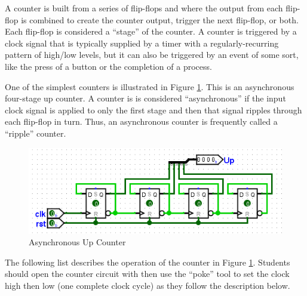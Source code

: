 A counter is built from a series of flip-flops and where the output from each flip-flop is combined to create the counter output, trigger the next flip-flop, or both. Each flip-flop is considered a ``stage'' of the counter. A counter is triggered by a clock signal that is typically supplied by a timer with a regularly-recurring pattern of high/low levels, but it can also be triggered by an event of some sort, like the press of a button or the completion of a process.

One of the simplest counters is illustrated in Figure \ref{fig:count-01}. This is an asynchronous four-stage up counter. A counter is is considered ``asynchronous'' if the input clock signal is applied to only the first stage and then that signal ripples through each flip-flop in turn. Thus, an asynchronous counter is frequently called a ``ripple'' counter.

\begin{figure}[H]
	\centering
	\includegraphics[width=\maxwidth{.95\linewidth}]{gfx/count-01}
	\caption{Asynchronous Up Counter}
	\label{fig:count-01}
\end{figure}

The following list describes the operation of the counter in Figure \ref{fig:count-01}. Students should open the counter circuit with \LE then use the ``poke'' tool to set the clock high then low (one complete clock cycle) as they follow the description below.

